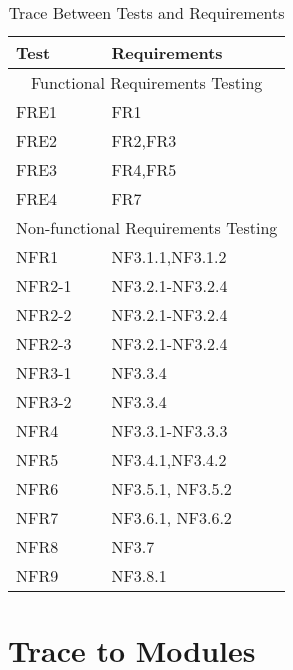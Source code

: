 \documentclass[12pt, titlepage]{article}
\begin{document}
\begin{table}[!htbp]
			\begin{tabular}{ll}
				\toprule
				Test & Requirements \\
				\midrule
				\multicolumn{2}{c}{Functional Requirements Testing} \\
				\midrule
				FRE1 & FR1 \\
				FRE2 & FR2,FR3 \\
				FRE3 & FR4,FR5 \\
				FRE4 & FR7 \\
				\midrule
				\multicolumn{2}{c}{Non-functional Requirements Testing} \\
				\midrule
				NFR1 & NF3.1.1,NF3.1.2 \\
				NFR2-1 & NF3.2.1-NF3.2.4\\
				NFR2-2 & NF3.2.1-NF3.2.4\\
				NFR2-3 & NF3.2.1-NF3.2.4\\
				NFR3-1 & NF3.3.4\\
				NFR3-2 & NF3.3.4\\
				NFR4 & NF3.3.1-NF3.3.3 \\
				NFR5 & NF3.4.1,NF3.4.2 \\
				NFR6 & NF3.5.1, NF3.5.2 \\
				NFR7 & NF3.6.1, NF3.6.2 \\
				NFR8 & NF3.7 \\
				NFR9 & NF3.8.1\\
				
				\bottomrule
			\end{tabular}
			\caption{Trace Between Tests and Requirements}
			\makeatletter
			\def\rulecolor#1#{\CT@arc{#1}}
			\def\CT@arc#1#2{%
				\ifdim\baselineskip=\z@\noalign\fi
				{\gdef\CT@arc@{\color#1{#2}}}}
			\let\CT@arc@\relax
			\makeatother
			\label{Table}
		\end{table}
		
		\FloatBarrier
	
	\newpage

\section{Trace to Modules}	
\end{document}
